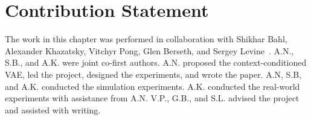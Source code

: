 \section{Contribution Statement}

The work in this chapter was performed in collaboration with Shikhar Bahl, Alexander Khazatsky, Vitchyr Pong, Glen Berseth, and Sergey Levine~\citep{nair2018rig}. A.N., S.B., and A.K. were joint co-first authors. A.N. proposed the context-conditioned VAE, led the project, designed the experiments, and wrote the paper. A.N, S.B, and A.K. conducted the simulation experiments. A.K. conducted the real-world experiments with assistance from A.N. V.P., G.B., and S.L. advised the project and assisted with writing.
